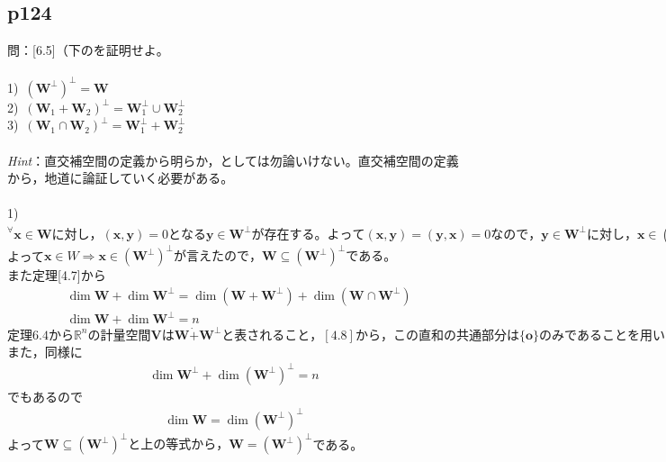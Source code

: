\documentclass[dvipdfmx,uplatex,11pt]{jsarticle}
\begin{document}
\subsection{p124}
\noindent
問：[6.5]（下のを証明せよ。\\ \\
1)~$(\bm{W}^{\perp })^{\perp }=\bm{W}$ \\
2)~$(\bm{W}_1+\bm{W}_2)^{\perp}=\bm{W}^{\perp}_1 \cup \bm{W}^{\perp}_2 $\\
3)~$(\bm{W}_1 \cap \bm{W}_2)^{\perp}=\bm{W}^{\perp}_1+\bm{W}^{\perp}_2 $ \\ \\
\textsl{Hint}：直交補空間の定義から明らか，としては勿論いけない。直交補空間の定義から，地道に論証していく必要がある。\\ 
\dotfill \\
1)$^{\forall}\bm{x} \in \bm{W}に対し，(\bm{x},\bm{y})=0となる\bm{y} \in \bm{W}^{\perp}が存在する。よって(\bm{x},\bm{y})=(\bm{y},\bm{x})=0なので，\bm{y} \in \bm{W}^{\perp}に対し，\bm{x} \in (\bm{W}^{\perp})^{\perp}である。$\\
よって$\bm{x} \in W \Longrightarrow \bm{x} \in  (\bm{W}^{\perp})^{\perp}が言えたので，\bm{W} \subseteq  (\bm{W}^{\perp})^{\perp}である。$\\
また定理[4.7]から
\begin{eqnarray*}
& \dim \bm{W} +\dim \bm{W}^{\perp} =\dim (\bm{W} +\bm{W}^{\perp} )+\dim (\bm{W} \cap \bm{W}^{\perp} ) \\
& \dim \bm{W} +\dim \bm{W}^{\perp} =n
\end{eqnarray*}
$定理6.4から\mathbb{R}^nの計量空間\bm{V}は\bm{W}\dot{+}\bm{W}^{\perp}と表されること，[4.8]から，この直和の共通部分は\{ \bm{o} \}のみであることを用いた。$\\
また，同様に
\begin{eqnarray*}
\dim \bm{W}^{\perp} +\dim (\bm{W}^{\perp})^{\perp} =n
\end{eqnarray*}
でもあるので
\begin{eqnarray*}
\dim \bm{W} =\dim (\bm{W}^{\perp})^{\perp}
\end{eqnarray*}
よって$\bm{W} \subseteq  (\bm{W}^{\perp})^{\perp}と上の等式から，\bm{W} =  (\bm{W}^{\perp})^{\perp}$である。
%
%
%
\newpage
%
%
%
\end{document}
